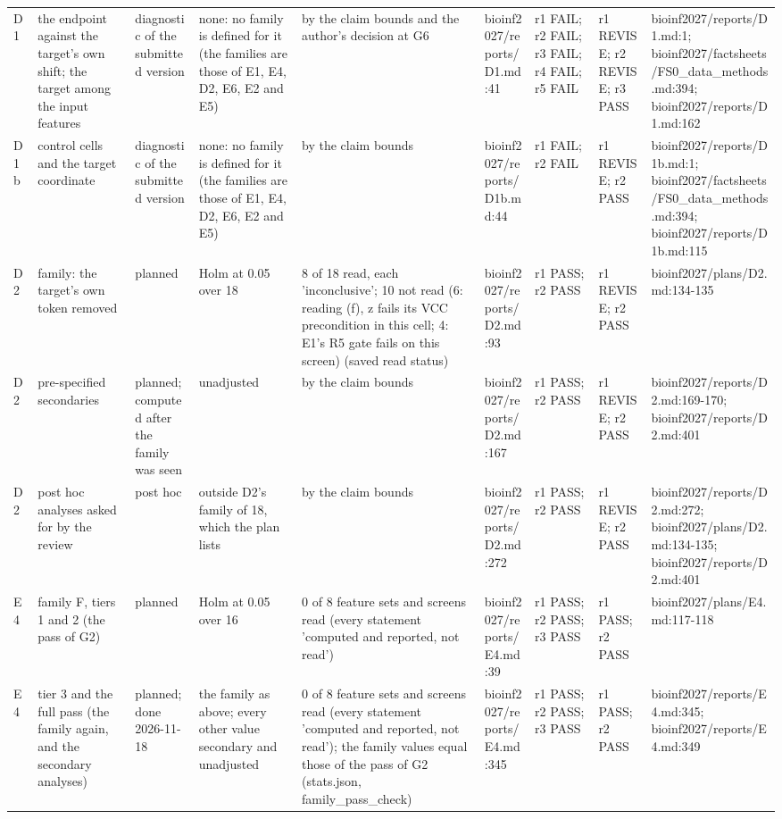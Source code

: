 \begin{tabular}{lllllllll}
D1 & the endpoint against the target's own shift; the target among the input features & diagnostic of the submitted version & none: no family is defined for it (the families are those of E1, E4, D2, E6, E2 and E5) & by the claim bounds and the author's decision at G6 & bioinf2027/reports/D1.md:41 & r1 FAIL; r2 FAIL; r3 FAIL; r4 FAIL; r5 FAIL & r1 REVISE; r2 REVISE; r3 PASS & bioinf2027/reports/D1.md:1; bioinf2027/factsheets/FS0\_data\_methods.md:394; bioinf2027/reports/D1.md:162 \\
D1b & control cells and the target coordinate & diagnostic of the submitted version & none: no family is defined for it (the families are those of E1, E4, D2, E6, E2 and E5) & by the claim bounds & bioinf2027/reports/D1b.md:44 & r1 FAIL; r2 FAIL & r1 REVISE; r2 PASS & bioinf2027/reports/D1b.md:1; bioinf2027/factsheets/FS0\_data\_methods.md:394; bioinf2027/reports/D1b.md:115 \\
D2 & family: the target's own token removed & planned & Holm at 0.05 over 18 & 8 of 18 read, each 'inconclusive'; 10 not read (6: reading (f), z fails its VCC precondition in this cell; 4: E1's R5 gate fails on this screen) (saved read status) & bioinf2027/reports/D2.md:93 & r1 PASS; r2 PASS & r1 REVISE; r2 PASS & bioinf2027/plans/D2.md:134-135 \\
D2 & pre-specified secondaries & planned; computed after the family was seen & unadjusted & by the claim bounds & bioinf2027/reports/D2.md:167 & r1 PASS; r2 PASS & r1 REVISE; r2 PASS & bioinf2027/reports/D2.md:169-170; bioinf2027/reports/D2.md:401 \\
D2 & post hoc analyses asked for by the review & post hoc & outside D2's family of 18, which the plan lists & by the claim bounds & bioinf2027/reports/D2.md:272 & r1 PASS; r2 PASS & r1 REVISE; r2 PASS & bioinf2027/reports/D2.md:272; bioinf2027/plans/D2.md:134-135; bioinf2027/reports/D2.md:401 \\
E4 & family F, tiers 1 and 2 (the pass of G2) & planned & Holm at 0.05 over 16 & 0 of 8 feature sets and screens read (every statement 'computed and reported, not read') & bioinf2027/reports/E4.md:39 & r1 PASS; r2 PASS; r3 PASS & r1 PASS; r2 PASS & bioinf2027/plans/E4.md:117-118 \\
E4 & tier 3 and the full pass (the family again, and the secondary analyses) & planned; done 2026-11-18 & the family as above; every other value secondary and unadjusted & 0 of 8 feature sets and screens read (every statement 'computed and reported, not read'); the family values equal those of the pass of G2 (stats.json, family\_pass\_check) & bioinf2027/reports/E4.md:345 & r1 PASS; r2 PASS; r3 PASS & r1 PASS; r2 PASS & bioinf2027/reports/E4.md:345; bioinf2027/reports/E4.md:349 \\

\end{tabular}
